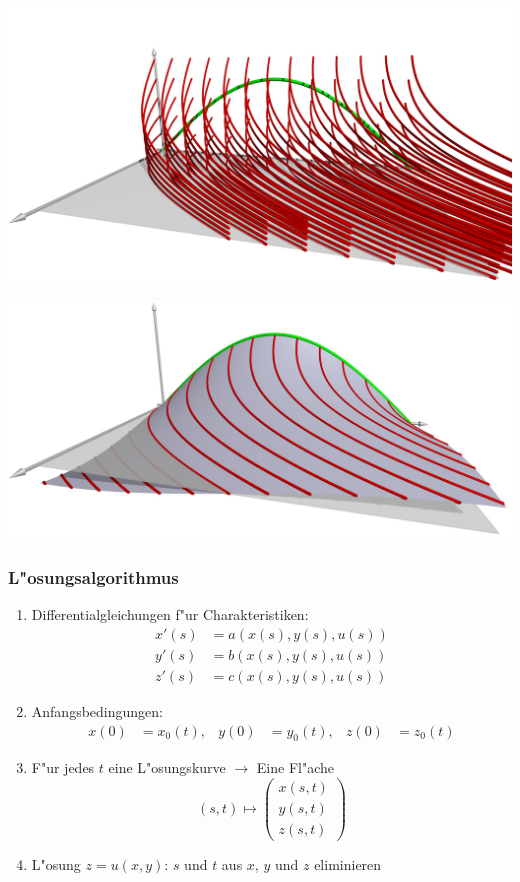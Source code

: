 \begin{frame}
\begin{center}
\includegraphics[width=\hsize]{../../common/3d/chr.jpg}
\end{center}
\end{frame}

\begin{frame}
\begin{center}
\includegraphics[width=\hsize]{../../common/3d/sol.jpg}
\end{center}
\end{frame}

\begin{frame}
\frametitle{L"osungsalgorithmus}
\begin{enumerate}
\item Differentialgleichungen f"ur Charakteristiken:
\pause
\begin{align*}
x'(s)&=a(x(s),y(s),u(s))\\
y'(s)&=b(x(s),y(s),u(s))\\
z'(s)&=c(x(s),y(s),u(s))
\end{align*}
\pause
\item Anfangsbedingungen:
\pause
\begin{align*}
x(0)&=x_0(t),&
y(0)&=y_0(t),&
z(0)&=z_0(t)
\end{align*}%
\pause
\item F"ur jedes $t$ eine L"osungskurve $\to$ Eine Fl"ache
\pause
\[
(s,t)\mapsto\begin{pmatrix}
x(s,t)\\
y(s,t)\\
z(s,t)
\end{pmatrix}
\]
\pause
\item L"osung $z=u(x,y)$:
\pause
$s$ und $t$ aus $x$, $y$ und $z$ eliminieren
\end{enumerate}
\end{frame}

